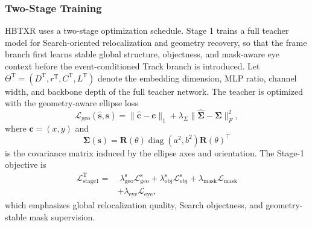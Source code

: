 \documentclass[journal]{IEEEtran}
\begin{document}
\subsubsection{Two-Stage Training}
HBTXR uses a two-stage optimization schedule. Stage 1 trains a full teacher model for Search-oriented relocalization and geometry recovery, so that the frame branch first learns stable global structure, objectness, and mask-aware eye context before the event-conditioned Track branch is introduced. Let $\Theta^{\mathrm{T}}=(D^{\mathrm{T}}, r^{\mathrm{T}}, C^{\mathrm{T}}, L^{\mathrm{T}})$ denote the embedding dimension, MLP ratio, channel width, and backbone depth of the full teacher network. The teacher is optimized with the geometry-aware ellipse loss
\begin{equation}
\mathcal L_{\mathrm{geo}}(\hat{\mathbf s},\mathbf s)=
\|\hat{\mathbf c}-\mathbf c\|_1 + \lambda_{\Sigma}\|\hat{\bm\Sigma}-\bm\Sigma\|_F^2,
\end{equation}
where $\mathbf c=(x,y)$ and
\begin{equation}
\bm\Sigma(\mathbf s)=
\mathbf R(\theta)\operatorname{diag}(a^2,b^2)\mathbf R(\theta)^{\top}
\end{equation}
is the covariance matrix induced by the ellipse axes and orientation. The Stage-1 objective is
\begin{align}
\mathcal L_{\mathrm{stage1}}^{\mathrm{T}} =
&\;\lambda_{\mathrm{geo}}^{\mathrm{s}}\mathcal L_{\mathrm{geo}}^{\mathrm{s}}
+ \lambda_{\mathrm{obj}}^{\mathrm{s}}\mathcal L_{\mathrm{obj}}^{\mathrm{s}}
+ \lambda_{\mathrm{mask}}\mathcal L_{\mathrm{mask}}
\nonumber\\
&+ \lambda_{\mathrm{eye}}\mathcal L_{\mathrm{eye}},
\end{align}
which emphasizes global relocalization quality, Search objectness, and geometry-stable mask supervision.
\end{document}
